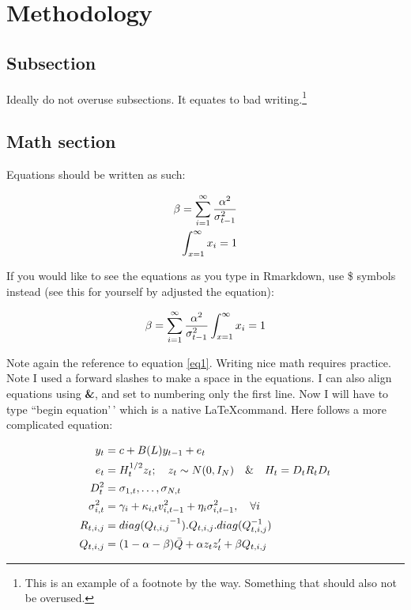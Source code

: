 \documentclass[11pt,preprint, authoryear]{elsarticle}
\numberwithin{equation}{section}
\numberwithin{figure}{section}
\numberwithin{table}{section}
\let\rmarkdownfootnote\footnote%
\def\footnote{\protect\rmarkdownfootnote}
\begin{document}
\hypertarget{methodology}{%
\section{\texorpdfstring{Methodology
\label{Meth}}{Methodology }}\label{methodology}}

\hypertarget{subsection}{%
\subsection{Subsection}\label{subsection}}

Ideally do not overuse subsections. It equates to bad
writing.\footnote{This is an example of a footnote by the way. Something
  that should also not be overused.}

\hypertarget{math-section}{%
\subsection{Math section}\label{math-section}}

Equations should be written as such:

\begin{align}
\beta = \sum_{i = 1}^{\infty}\frac{\alpha^2}{\sigma_{t-1}^2} \label{eq1} \\
\int_{x = 1}^{\infty}x_{i} = 1 \notag
\end{align}

If you would like to see the equations as you type in Rmarkdown, use \$
symbols instead (see this for yourself by adjusted the equation):

\[
\beta = \sum_{i = 1}^{\infty}\frac{\alpha^2}{\sigma_{t-1}^2} \\
\int_{x = 1}^{\infty}x_{i} = 1
\]

Note again the reference to equation \ref{eq1}. Writing nice math
requires practice. Note I used a forward slashes to make a space in the
equations. I can also align equations using \textbf{\&}, and set to
numbering only the first line. Now I will have to type ``begin
equation'\,' which is a native \LaTeX command. Here follows a more
complicated equation:

\begin{align}
    y_t &= c + B(L) y_{t-1} + e_t   \label{eq2}    \\ \notag
    e_t &= H_t^{1/2}  z_t ; \quad z_t \sim  N(0,I_N) \quad \& \quad H_t = D_tR_tD_t \\ \notag
        D_t^2 &= {\sigma_{1,t}, \dots, \sigma_{N,t}}   \\ \notag
        \sigma_{i,t}^2 &= \gamma_i+\kappa_{i,t}  v_{i, t-1}^2 +\eta_i  \sigma_{i, t-1}^2, \quad \forall i \\ \notag
        R_{t, i, j} &= {diag(Q_{t, i, j}}^{-1}) . Q_{t, i, j} . diag(Q_{t, i, j}^{-1})  \\ \notag
        Q_{t, i, j} &= (1-\alpha-\beta)  \bar{Q} + \alpha  z_t  z_t'  + \beta  Q_{t, i, j} \notag
\end{align}
\end{document}
